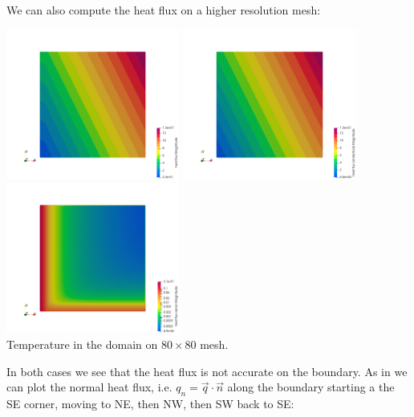 We can also compute the heat flux on a higher resolution mesh:
\begin{center}
\includegraphics[width=5.7cm]{python_codes/fieldstone_173/results/q80}
\includegraphics[width=5.7cm]{python_codes/fieldstone_173/results/q80_analytical}
\includegraphics[width=5.7cm]{python_codes/fieldstone_173/results/q80_error}\\
{\captionfont Temperature in the domain on $80 \times 80$ mesh.}
\end{center}

In both cases we see that the heat flux is not accurate on the boundary.
As in \textcite{grls87} we can plot the normal heat flux, i.e. $q_n=\vec{q}\cdot \vec{n}$
along the boundary starting a the SE corner, moving to NE, then NW, then SW back to SE:

